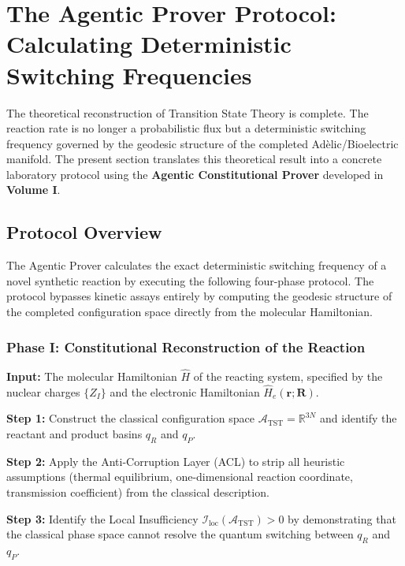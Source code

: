 \documentclass[11pt,openany]{extbook}
\theoremstyle{plain}
\theoremstyle{definition}
\begin{document}
\section{The Agentic Prover Protocol: Calculating Deterministic Switching Frequencies}

\noindent The theoretical reconstruction of Transition State Theory is complete. The reaction rate is no longer a probabilistic flux but a deterministic switching frequency governed by the geodesic structure of the completed Adèlic/Bioelectric manifold. The present section translates this theoretical result into a concrete laboratory protocol using the \textbf{Agentic Constitutional Prover} developed in \textbf{Volume I}.

\subsection{Protocol Overview}

\noindent The Agentic Prover calculates the exact deterministic switching frequency of a novel synthetic reaction by executing the following four-phase protocol. The protocol bypasses kinetic assays entirely by computing the geodesic structure of the completed configuration space directly from the molecular Hamiltonian.

\subsubsection{Phase I: Constitutional Reconstruction of the Reaction}

\noindent \textbf{Input:} The molecular Hamiltonian $\hat{H}$ of the reacting system, specified by the nuclear charges $\{Z_I\}$ and the electronic Hamiltonian $\hat{H}_e(\mathbf{r}; \mathbf{R})$.

\noindent \textbf{Step 1:} Construct the classical configuration space $\mathcal{A}_{\mathrm{TST}} = \mathbb{R}^{3N}$ and identify the reactant and product basins $q_R$ and $q_P$.

\noindent \textbf{Step 2:} Apply the Anti-Corruption Layer (ACL) to strip all heuristic assumptions (thermal equilibrium, one-dimensional reaction coordinate, transmission coefficient) from the classical description.

\noindent \textbf{Step 3:} Identify the Local Insufficiency $\mathcal{I}_{\mathrm{loc}}(\mathcal{A}_{\mathrm{TST}}) > 0$ by demonstrating that the classical phase space cannot resolve the quantum switching between $q_R$ and $q_P$.
\end{document}

